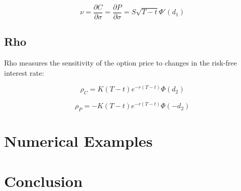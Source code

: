 \documentclass[../Main.tex]{subfiles}
\begin{document}
\begin{equation}
    \nu = \frac{\partial C}{\partial \sigma} = \frac{\partial P}{\partial \sigma} = S \sqrt{T - t} \Phi'(d_1)
\end{equation}

\subsection{Rho}

Rho measures the sensitivity of the option price to changes in the risk-free interest rate:

\begin{equation}
    \rho_C = K (T - t) e^{-r(T - t)} \Phi(d_2)
\end{equation}

\begin{equation}
    \rho_P = -K (T - t) e^{-r(T - t)} \Phi(-d_2)
\end{equation}


\section{Numerical Examples}



\section{Conclusion}

%
\end{document}
